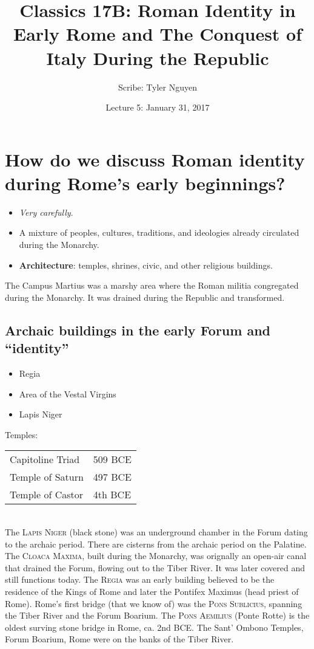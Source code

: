 \documentclass{article}
\begin{document}
\title{Classics 17B: Roman Identity in Early Rome and The Conquest of Italy During the Republic}
\author{Scribe: Tyler Nguyen}
\date{Lecture 5: January 31, 2017}
\maketitle
\section{How do we discuss Roman identity during Rome's early beginnings?}
\begin{itemize}
\item \textit{Very carefully}.
\item A mixture of peoples, cultures, traditions, and ideologies already circulated during the Monarchy.
\item \textbf{Architecture}: temples, shrines, civic, and other religious buildings.
\end{itemize}
The Campus Martius was a marshy area where the Roman militia congregated during the Monarchy.  It was drained during the Republic and transformed.
\subsection{Archaic buildings in the early Forum and ``identity''}
\begin{itemize}
\item Regia
\item Area of the Vestal Virgins
\item Lapis Niger
\end{itemize}
Temples:\\
\begin{tabular}{ll}
Capitoline Triad & 509 BCE\\
Temple of Saturn & 497 BCE\\
Temple of Castor & 4th BCE\\
\end{tabular}\\
The \textsc{Lapis Niger} (black stone) was an underground chamber in the Forum dating to the archaic period.  There are cisterns from the archaic period on the Palatine.  The \textsc{Cloaca Maxima}, built during the Monarchy, was orignally an open-air canal that drained the Forum, flowing out to the Tiber River.  It was later covered and still functions today.  The \textsc{Regia} was an early building believed to be the residence of the Kings of Rome and later the Pontifex Maximus (head priest of Rome).  Rome's first bridge (that we know of) was the \textsc{Pons Sublicius}, spanning the Tiber River and the Forum Boarium.  The \textsc{Pons Aemilius} (Ponte Rotte) is the  oldest surving stone bridge in Rome, ca. 2nd BCE.  The Sant' Ombono Temples, Forum Boarium, Rome were on the banks of the Tiber River.
\end{document}
